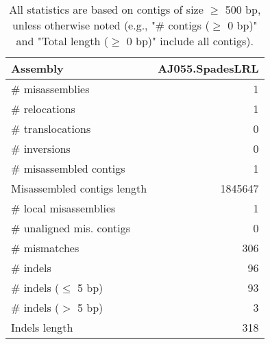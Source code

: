 \documentclass[12pt,a4paper]{article}
\begin{document}
\begin{table}[ht]
\begin{center}
\caption{All statistics are based on contigs of size $\geq$ 500 bp, unless otherwise noted (e.g., "\# contigs ($\geq$ 0 bp)" and "Total length ($\geq$ 0 bp)" include all contigs).}
\begin{tabular}{|l*{1}{|r}|}
\hline
Assembly & AJ055.SpadesLRL \\ \hline
\# misassemblies & 1 \\ \hline
\hspace{5mm}\# relocations & 1 \\ \hline
\hspace{5mm}\# translocations & 0 \\ \hline
\hspace{5mm}\# inversions & 0 \\ \hline
\# misassembled contigs & 1 \\ \hline
Misassembled contigs length & 1845647 \\ \hline
\# local misassemblies & 1 \\ \hline
\# unaligned mis. contigs & 0 \\ \hline
\# mismatches & 306 \\ \hline
\# indels & 96 \\ \hline
\hspace{5mm}\# indels ($\leq$ 5 bp) & 93 \\ \hline
\hspace{5mm}\# indels ($>$ 5 bp) & 3 \\ \hline
Indels length & 318 \\ \hline
\end{tabular}
\end{center}
\end{table}
\end{document}
